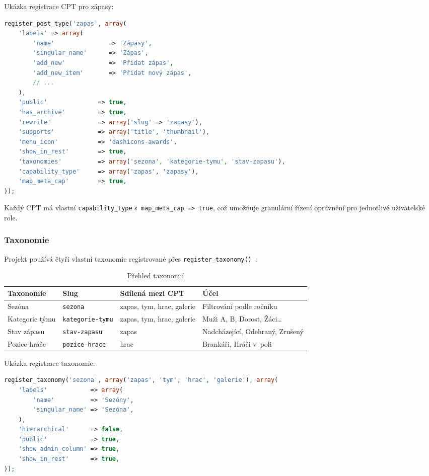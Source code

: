 \documentclass[12pt,a4paper]{article}
\begin{document}
Ukázka registrace CPT pro zápasy:

\begin{lstlisting}[language=PHP]
register_post_type('zapas', array(
    'labels' => array(
        'name'               => 'Zápasy',
        'singular_name'      => 'Zápas',
        'add_new'            => 'Přidat zápas',
        'add_new_item'       => 'Přidat nový zápas',
        // ...
    ),
    'public'              => true,
    'has_archive'         => true,
    'rewrite'             => array('slug' => 'zapasy'),
    'supports'            => array('title', 'thumbnail'),
    'menu_icon'           => 'dashicons-awards',
    'show_in_rest'        => true,
    'taxonomies'          => array('sezona', 'kategorie-tymu', 'stav-zapasu'),
    'capability_type'     => array('zapas', 'zapasy'),
    'map_meta_cap'        => true,
));
\end{lstlisting}

Každý CPT má vlastní \texttt{capability\_type} s~\texttt{map\_meta\_cap => true}, což umožňuje granulární řízení oprávnění pro jednotlivé uživatelské role.

\subsubsection{Taxonomie}

Projekt používá čtyři vlastní taxonomie registrované přes \texttt{register\_taxonomy()}~\cite{wpdev}:

\begin{table}[H]
\centering
\small
\begin{tabularx}{\textwidth}{l l l X}
\toprule
\textbf{Taxonomie} & \textbf{Slug} & \textbf{Sdílená mezi CPT} & \textbf{Účel} \\
\midrule
Sezóna & \texttt{sezona} & zapas, tym, hrac, galerie & Filtrování podle ročníku \\
Kategorie týmu & \texttt{kategorie-tymu} & zapas, tym, hrac, galerie & Muži A, B, Dorost, Žáci\ldots \\
Stav zápasu & \texttt{stav-zapasu} & zapas & Nadcházející, Odehraný, Zrušený \\
Pozice hráče & \texttt{pozice-hrace} & hrac & Brankáři, Hráči v~poli \\
\bottomrule
\end{tabularx}
\caption{Přehled taxonomií}
\end{table}

Ukázka registrace taxonomie:

\begin{lstlisting}[language=PHP]
register_taxonomy('sezona', array('zapas', 'tym', 'hrac', 'galerie'), array(
    'labels'            => array(
        'name'          => 'Sezóny',
        'singular_name' => 'Sezóna',
    ),
    'hierarchical'      => false,
    'public'            => true,
    'show_admin_column' => true,
    'show_in_rest'      => true,
));
\end{lstlisting}
\end{document}
